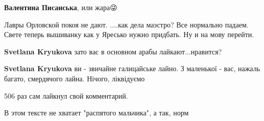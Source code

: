 \begin{itemize}
\begin{itemize}
 
\textbf{Валентина Писанська}, или жара😜

 
Лавры Орловской покоя не дают. ....как дела маэстро? Все нормально падаем. Свете теперь вышиванку как у Яресько нужно придбать. Ну и на мову перейти.

 
\textbf{Svetlana Kryukova} зато вас в основном арабы лайкают...нравится?

 
\textbf{Svetlana Kryukova} ви - звичайне галицайське лайно. З маленької - вас, нажаль багато, смердячого лайна. Нічого, ліквідуємо

 
506 раз сам лайкнул свой комментарий.\Laughey[1.0][white]

 
В этом тексте не хватает "распятого мальчика", а так, норм

 

\end{itemize}
\end{itemize}
